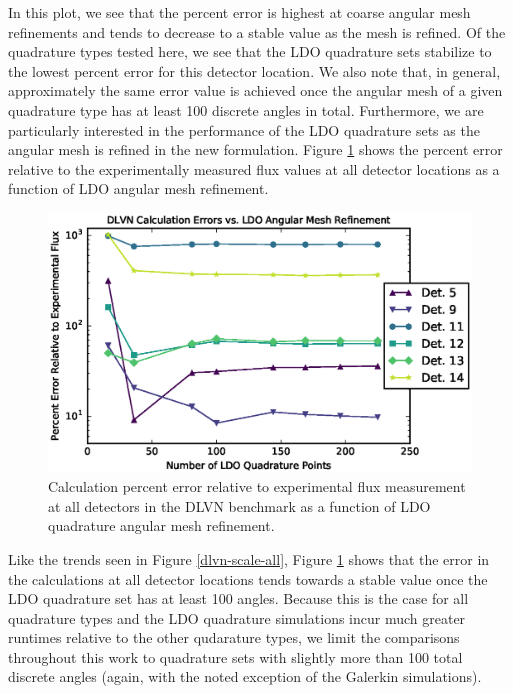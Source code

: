 \documentclass{article} %
\begin{document}
In this plot, we see that the percent error is highest at coarse angular mesh
refinements and tends to decrease to a stable value as the mesh is refined. Of
the quadrature types tested here, we see that the LDO quadrature sets
stabilize to the lowest percent error for this detector location. We also
note that, in general, approximately the same error value is achieved once the
angular mesh of a given quadrature type has at least 100 discrete angles in
total. Furthermore, we are particularly interested in the performance of the
LDO quadrature sets as the angular mesh is refined in the new formulation.
Figure \ref{dlvn-scale-ldo} shows the percent error relative to the
experimentally measured flux values at all detector locations as a function of
LDO angular mesh refinement.

\begin{figure}[!htb]
\centering
\includegraphics{dlvn-error-scale-ldo.eps}
\caption{Calculation percent error relative to experimental flux 
         measurement at all detectors in the DLVN benchmark as a function of 
         LDO quadrature angular mesh refinement.}
\label{dlvn-scale-ldo}
\end{figure}

Like the trends seen in Figure \ref{dlvn-scale-all}, Figure \ref{dlvn-scale-ldo}
shows that the error in the calculations at all detector locations tends
towards a stable value once the LDO quadrature set has at least 100 angles.
Because this is the case for all quadrature types and the LDO quadrature
simulations incur much greater runtimes relative to the other qudarature
types, we limit the comparisons throughout this work to quadrature sets with
slightly more than 100 total discrete angles (again, with the noted exception
of the Galerkin simulations).
\end{document}
